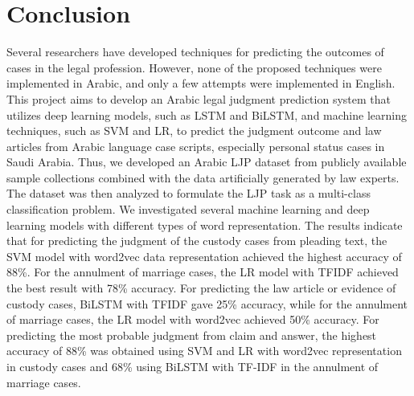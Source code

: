 \documentclass[sn-mathphys,Numbered]{sn-jnl}%
\theoremstyle{thmstyleone}%
\theoremstyle{thmstyletwo}%
\theoremstyle{thmstylethree}%
\begin{document}
\section{Conclusion}\label{sec:Con}
Several researchers have developed techniques for predicting the outcomes of cases in the legal profession. However, none of the proposed techniques were implemented in Arabic, and only a few attempts were implemented in English. This project aims to develop an Arabic legal judgment prediction system that utilizes deep learning models, such as LSTM and BiLSTM, and machine learning techniques, such as SVM and LR, to predict the judgment outcome and law articles from Arabic language case scripts, especially personal status cases in Saudi Arabia. %
Thus, we developed an Arabic LJP dataset from publicly available sample collections combined with the data artificially generated by law experts. The dataset was then analyzed to formulate the LJP task as a multi-class classification problem.
We investigated several machine learning and deep learning models with different types of word representation. The results indicate that for predicting the judgment of the custody cases from pleading text, the SVM model with word2vec data representation achieved the highest accuracy of 88\%. For the annulment of marriage cases, the LR model with TFIDF achieved the best result with 78\% accuracy. For predicting the law article or evidence of custody cases, BiLSTM with TFIDF gave 25\% accuracy, while for the annulment of marriage cases, the LR model with word2vec achieved 50\% accuracy. For predicting the most probable judgment from claim and answer, the highest accuracy of 88\% was obtained using SVM and LR with word2vec representation in custody cases and 68\%  using BiLSTM with TF-IDF in the annulment of marriage cases. 

 


%

%
%

\end{document}
